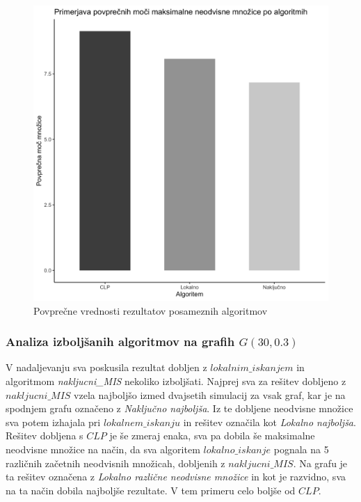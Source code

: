\documentclass[a4paper, 12pt]{article}
\begin{document}
\begin{figure}[h!]
	\begin{center}
		\includegraphics[scale=0.11]{R_koda/pon-povpmoc.png}
		\caption{Povprečne vrednosti rezultatov posameznih algoritmov}
	\end{center}
\end{figure}

\subsubsection{Analiza izboljšanih algoritmov na grafih $G(30, 0.3)$}

\noindent V nadaljevanju sva poskusila rezultat dobljen z $lokalnim\_iskanjem$ in algoritmom \textit{nakljucni\_MIS} nekoliko izboljšati. 
Najprej sva za rešitev dobljeno z $nakljucni\_MIS$ vzela najboljšo izmed dvajsetih simulacij za vsak graf, kar je na spodnjem grafu označeno z 
\textit{Naključno najboljša}. Iz te dobljene neodvisne množice sva potem izhajala pri $lokalnem\_iskanju$ in rešitev označila kot
\textit{Lokalno najboljša}. Rešitev dobljena s $CLP$ je še zmeraj enaka, sva pa dobila še maksimalne neodvisne množice na način, da sva algoritem $lokalno\_iskanje$
pognala na 5 različnih začetnih neodvisnih množicah, dobljenih z $nakljucni\_MIS$. Na grafu je ta rešitev označena z \textit{Lokalno različne neodvisne množice} in kot je razvidno, 
sva na ta način dobila najboljše rezultate. V tem primeru celo boljše od $CLP$.
\end{document}
